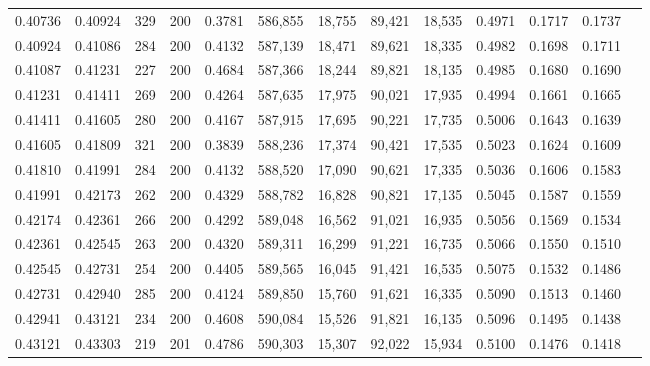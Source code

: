 \begin{tabular}{rrrrrrrrrrrrr}
0.40736 & 0.40924 &    329 & 200 &                                     0.3781 & 586,855 &  18,755 &  89,421 &  18,535 & 0.4971 & 0.1717 & 0.1737 \\
0.40924 & 0.41086 &    284 & 200 &                                     0.4132 & 587,139 &  18,471 &  89,621 &  18,335 & 0.4982 & 0.1698 & 0.1711 \\
0.41087 & 0.41231 &    227 & 200 &                                     0.4684 & 587,366 &  18,244 &  89,821 &  18,135 & 0.4985 & 0.1680 & 0.1690 \\
0.41231 & 0.41411 &    269 & 200 &                                     0.4264 & 587,635 &  17,975 &  90,021 &  17,935 & 0.4994 & 0.1661 & 0.1665 \\
0.41411 & 0.41605 &    280 & 200 &                                     0.4167 & 587,915 &  17,695 &  90,221 &  17,735 & 0.5006 & 0.1643 & 0.1639 \\
0.41605 & 0.41809 &    321 & 200 &                                     0.3839 & 588,236 &  17,374 &  90,421 &  17,535 & 0.5023 & 0.1624 & 0.1609 \\
0.41810 & 0.41991 &    284 & 200 &                                     0.4132 & 588,520 &  17,090 &  90,621 &  17,335 & 0.5036 & 0.1606 & 0.1583 \\
0.41991 & 0.42173 &    262 & 200 &                                     0.4329 & 588,782 &  16,828 &  90,821 &  17,135 & 0.5045 & 0.1587 & 0.1559 \\
0.42174 & 0.42361 &    266 & 200 &                                     0.4292 & 589,048 &  16,562 &  91,021 &  16,935 & 0.5056 & 0.1569 & 0.1534 \\
0.42361 & 0.42545 &    263 & 200 &                                     0.4320 & 589,311 &  16,299 &  91,221 &  16,735 & 0.5066 & 0.1550 & 0.1510 \\
0.42545 & 0.42731 &    254 & 200 &                                     0.4405 & 589,565 &  16,045 &  91,421 &  16,535 & 0.5075 & 0.1532 & 0.1486 \\
0.42731 & 0.42940 &    285 & 200 &                                     0.4124 & 589,850 &  15,760 &  91,621 &  16,335 & 0.5090 & 0.1513 & 0.1460 \\
0.42941 & 0.43121 &    234 & 200 &                                     0.4608 & 590,084 &  15,526 &  91,821 &  16,135 & 0.5096 & 0.1495 & 0.1438 \\
0.43121 & 0.43303 &    219 & 201 &                                     0.4786 & 590,303 &  15,307 &  92,022 &  15,934 & 0.5100 & 0.1476 & 0.1418 \\

\end{tabular}
